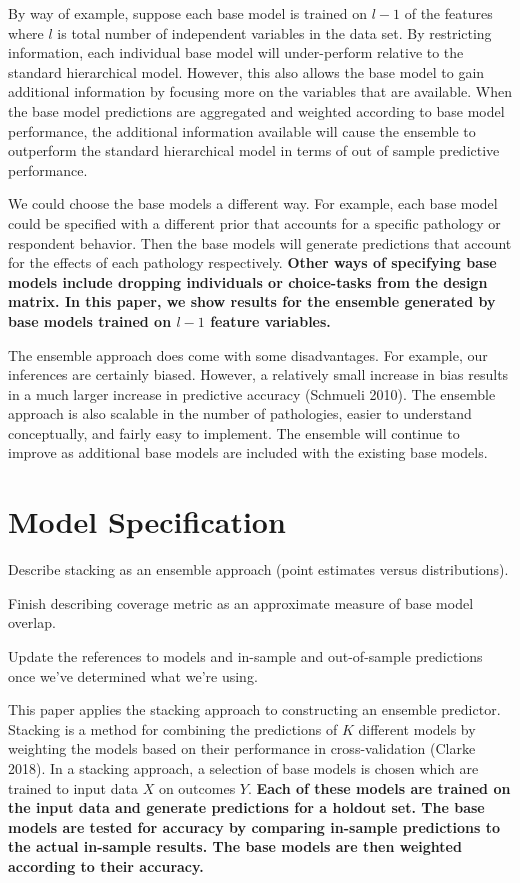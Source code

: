 \documentclass[12pt,titlepage]{mktg-article}
\begin{document}
By way of example, suppose each base model is trained on \(l-1\) of the features where \(l\) is total number of independent variables in the data set. By restricting information, each individual base model will under-perform relative to the standard hierarchical model. However, this also allows the base model to gain additional information by focusing more on the variables that are available. When the base model predictions are aggregated and weighted according to base model performance, the additional information available will cause the ensemble to outperform the standard hierarchical model in terms of out of sample predictive performance.

We could choose the base models a different way. For example, each base model could be specified with a different prior that accounts for a specific pathology or respondent behavior. Then the base models will generate predictions that account for the effects of each pathology respectively. \textbf{Other ways of specifying base models include dropping individuals or choice-tasks from the design matrix. In this paper, we show results for the ensemble generated by base models trained on \(l-1\) feature variables.}

The ensemble approach does come with some disadvantages. For example, our inferences are certainly biased. However, a relatively small increase in bias results in a much larger increase in predictive accuracy (Schmueli 2010). The ensemble approach is also scalable in the number of pathologies, easier to understand conceptually, and fairly easy to implement. The ensemble will continue to improve as additional base models are included with the existing base models.

\hypertarget{model-specification}{%
\section{Model Specification}\label{model-specification}}

Describe stacking as an ensemble approach (point estimates versus distributions).

Finish describing coverage metric as an approximate measure of base model overlap.

Update the references to models and in-sample and out-of-sample predictions once we've determined what we're using.

This paper applies the stacking approach to constructing an ensemble predictor. Stacking is a method for combining the predictions of \(K\) different models by weighting the models based on their performance in cross-validation (Clarke 2018). In a stacking approach, a selection of base models is chosen which are trained to input data \(X\) on outcomes \(Y\). \textbf{Each of these models are trained on the input data and generate predictions for a holdout set. The base models are tested for accuracy by comparing in-sample predictions to the actual in-sample results. The base models are then weighted according to their accuracy.}
\end{document}
